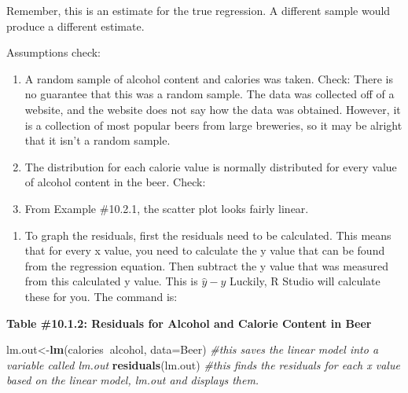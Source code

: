 \documentclass[]{book}
\newenvironment{Shaded}{\begin{snugshade}}{\end{snugshade}}
\newcommand{\CommentTok}[1]{\textcolor[rgb]{0.56,0.35,0.01}{\textit{#1}}}
\newcommand{\DataTypeTok}[1]{\textcolor[rgb]{0.13,0.29,0.53}{#1}}
\newcommand{\KeywordTok}[1]{\textcolor[rgb]{0.13,0.29,0.53}{\textbf{#1}}}
\newcommand{\NormalTok}[1]{#1}
\newcommand{\OperatorTok}[1]{\textcolor[rgb]{0.81,0.36,0.00}{\textbf{#1}}}
\providecommand{\tightlist}{%
  \setlength{\itemsep}{0pt}\setlength{\parskip}{0pt}}
\begin{document}
Remember, this is an estimate for the true regression. A different sample would produce a different estimate.

Assumptions check:

\begin{enumerate}
\def\labelenumi{\alph{enumi}.}
\item
  A random sample of alcohol content and calories was taken. Check: There is no guarantee that this was a random sample. The data was collected off of a website, and the website does not say how the data was obtained. However, it is a collection of most popular beers from large breweries, so it may be alright that it isn't a random sample.
\item
  The distribution for each calorie value is normally distributed for every value of alcohol content in the beer. Check:
\item
  From Example \#10.2.1, the scatter plot looks fairly linear.
\end{enumerate}

\begin{enumerate}
\def\labelenumi{\roman{enumi}.}
\setcounter{enumi}{1}
\tightlist
\item
  To graph the residuals, first the residuals need to be calculated. This means that for every x value, you need to calculate the y value that can be found from the regression equation. Then subtract the y value that was measured from this calculated y value. This is \(\hat{y}-y\) Luckily, R Studio will calculate these for you. The command is:
\end{enumerate}

\textbf{Table \#10.1.2: Residuals for Alcohol and Calorie Content in Beer}

\begin{Shaded}
\begin{Highlighting}[]
\NormalTok{lm.out<-}\KeywordTok{lm}\NormalTok{(calories}\OperatorTok{~}\NormalTok{alcohol, }\DataTypeTok{data=}\NormalTok{Beer) }\CommentTok{#this saves the linear model into a variable called lm.out}
\KeywordTok{residuals}\NormalTok{(lm.out) }\CommentTok{#this finds the residuals for each x value based on the linear model, lm.out and displays them.}
\end{Highlighting}
\end{Shaded}
\end{document}
